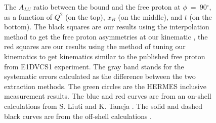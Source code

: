 \begin{figure}[tp]
\caption{ The $A_{LU}$ ratio between the bound and the free proton at 
   $\phi$~=~90$^{\circ}$, as a function of $Q^2$ (on the top), $x_B$ (on the 
   middle), and $t$ (on the bottom). The black squares are our results using 
   the interpolation method to get the free proton asymmetries at our kinematic 
   , the red squares are our results using the method of tuning our kinematics 
   to get kinematics similar to the published free proton from E1DVCS1 
   experiment. The gray band stands for the systematic errors calculated as the 
   difference between the two extraction methods. The green circles are the 
   HERMES inclusive measurement \cite{HERMES_BSA} results. The blue and red 
   curves are from an on-shell calculations from S.  Liuti and K.  Taneja 
   \cite{simonetta_2}. The solid and dashed black curves are from the off-shell 
   calculations \cite{EMC_vadim_2}.} \label{fig:incoh_EMC_ratio_ALU_proton}
\end{figure}





